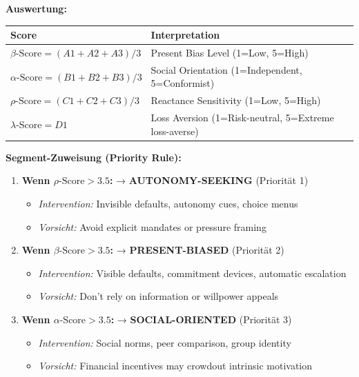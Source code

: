 \begin{tcolorbox}[colback=blue!5!white, colframe=blue!75!black, title=\textbf{Segment Screener: 10 Fragen, 2 Min Administrationszeit}]
\textbf{Auswertung:}

\begin{center}
\renewcommand{\arraystretch}{1.4}
\begin{tabular}{@{}ll@{}}
\toprule
\textbf{Score} & \textbf{Interpretation} \\
\midrule
$\beta\text{-Score} = (A1 + A2 + A3) / 3$ & Present Bias Level (1=Low, 5=High) \\
$\alpha\text{-Score} = (B1 + B2 + B3) / 3$ & Social Orientation (1=Independent, 5=Conformist) \\
$\rho\text{-Score} = (C1 + C2 + C3) / 3$ & Reactance Sensitivity (1=Low, 5=High) \\
$\lambda\text{-Score} = D1$ & Loss Aversion (1=Risk-neutral, 5=Extreme loss-averse) \\
\bottomrule
\end{tabular}
\end{center}

\textbf{Segment-Zuweisung (Priority Rule):}

\begin{enumerate}
\item \textbf{Wenn $\rho\text{-Score} > 3.5$:} → \textbf{AUTONOMY-SEEKING} (Priorität 1)
  \begin{itemize}[nosep]
  \item \textit{Intervention:} Invisible defaults, autonomy cues, choice menus
  \item \textit{Vorsicht:} Avoid explicit mandates or pressure framing
  \end{itemize}

\item \textbf{Wenn $\beta\text{-Score} > 3.5$:} → \textbf{PRESENT-BIASED} (Priorität 2)
  \begin{itemize}[nosep]
  \item \textit{Intervention:} Visible defaults, commitment devices, automatic escalation
  \item \textit{Vorsicht:} Don't rely on information or willpower appeals
  \end{itemize}

\item \textbf{Wenn $\alpha\text{-Score} > 3.5$:} → \textbf{SOCIAL-ORIENTED} (Priorität 3)
  \begin{itemize}[nosep]
  \item \textit{Intervention:} Social norms, peer comparison, group identity
  \item \textit{Vorsicht:} Financial incentives may crowdout intrinsic motivation
  \end{itemize}


\end{enumerate}
\end{tcolorbox}
